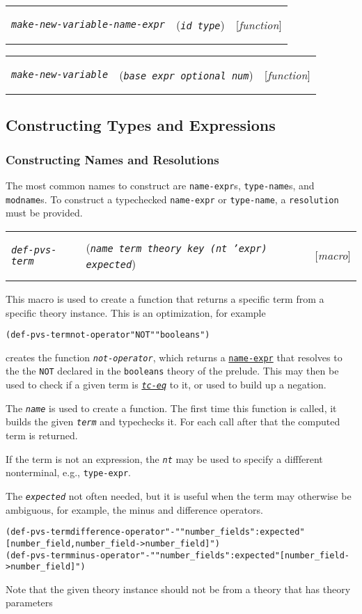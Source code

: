 \documentclass[12pt]{book}
\makeatletter
\def\ampoptional{{\smaller\sc {\smaller\smaller \&}optional\ }}
\def\ampkey{{\smaller\sc {\smaller\smaller \&}key\ }}
\newenvironment{function}[3]%
{\par\noindent\begin{boxedminipage}{\textwidth}%
 \par\noindent\begin{tabularx}{\linewidth}{l>{\raggedright}Xr}%
 \functionhtgt{#1}&(\texttt{\textit{#2}})&[\emph{#3}]%
 \end{tabularx}\par\flushright\begin{minipage}{.97\textwidth}}
{\end{minipage}\end{boxedminipage}}
\newcommand{\functionarg}[1]{\texttt{\textit{#1}}}
\newcommand{\functionnm}[1]{\texttt{\textit{#1}}}
\newcommand{\functionhln}[1]{\hyperlink{#1}{\functionnm{#1}}}
\newcommand{\functionhtgt}[1]{\hypertarget{#1}{\functionnm{#1}}\index{#1@\functionnm{#1}|underline}}
\newenvironment{lispfunction}[2]%
{\begin{function}{#1}{#2}{function}}{\end{function}}
\newenvironment{macro}[2]%
{\begin{function}{#1}{#2}{macro}}{\end{function}}
\newcommand{\classnm}[1]{\texttt{\textup{#1}}}
\newcommand{\classhln}[1]{\hyperlink{#1}{\classnm{#1}}}
\makeatother
\begin{document}
\begin{lispfunction}{make-new-variable-name-expr}{id type}
\end{lispfunction}

\begin{lispfunction}{make-new-variable}{base expr \ampoptional num}
\end{lispfunction}

\subsection{Constructing Types and Expressions}

\subsubsection{Constructing Names and Resolutions}

The most common names to construct are \texttt{name-expr}s,
\texttt{type-name}s, and \texttt{modname}s.  To construct a typechecked
\texttt{name-expr} or \texttt{type-name}, a \texttt{resolution} must be
provided.   


\begin{macro}{def-pvs-term}{name term theory \ampkey (nt \texttt{'expr}) expected}
This macro is used to create a function that returns a specific term
from a specific theory instance.  This is an optimization, for example
\begin{alltt}
  (def-pvs-term not-operator "NOT" "booleans")
\end{alltt}
creates the function \functionnm{not-operator}, which returns a
\classhln{name-expr} that resolves to the the \texttt{NOT} declared in the
\texttt{booleans} theory of the prelude.  This may then be used to check
if a given term is \functionhln{tc-eq} to it, or used to build up a
negation.  

The \functionarg{name} is used to create a function.  The first time this
function is called, it builds the given \functionarg{term} and typechecks
it.  For each call after that the computed term is returned.

If the term is not an expression, the \functionarg{nt} may be used to
specify a diffferent nonterminal, e.g., \texttt{type-expr}.

The \functionarg{expected} not often needed, but it is useful when the
term may otherwise be ambiguous, for example, the minus and difference
operators.
\begin{alltt}
(def-pvs-term difference-operator "-" "number_fields" :expected "[number_field, number_field -> number_field]")
(def-pvs-term minus-operator "-" "number_fields" :expected "[number_field -> number_field]")
\end{alltt}

Note that the given theory instance should not be from a theory that has
theory parameters
\end{macro}
\end{document}
